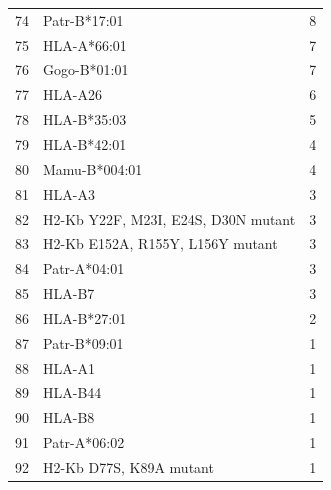 \begin{longtable}{r l r}
74 & Patr-B*17:01 & 8 \\
75 & HLA-A*66:01 & 7 \\
76 & Gogo-B*01:01 & 7 \\
77 & HLA-A26 & 6 \\
78 & HLA-B*35:03 & 5 \\
79 & HLA-B*42:01 & 4 \\
80 & Mamu-B*004:01 & 4 \\
81 & HLA-A3 & 3 \\
82 & H2-Kb Y22F, M23I, E24S, D30N mutant & 3 \\
83 & H2-Kb E152A, R155Y, L156Y mutant & 3 \\
84 & Patr-A*04:01 & 3 \\
85 & HLA-B7 & 3 \\
86 & HLA-B*27:01 & 2 \\
87 & Patr-B*09:01 & 1 \\
88 & HLA-A1 & 1 \\
89 & HLA-B44 & 1 \\
90 & HLA-B8 & 1 \\
91 & Patr-A*06:02 & 1 \\
92 & H2-Kb D77S, K89A mutant & 1 \\
\end{longtable}
